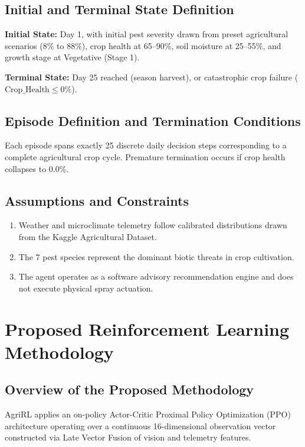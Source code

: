 \documentclass[12pt,a4paper]{report}
\begin{document}
\section{Initial and Terminal State Definition}
\textbf{Initial State:} Day 1, with initial pest severity drawn from preset agricultural scenarios (8\% to 88\%), crop health at 65--90\%, soil moisture at 25--55\%, and growth stage at Vegetative (Stage 1).

\textbf{Terminal State:} Day 25 reached (season harvest), or catastrophic crop failure ($\text{Crop\_Health} \le 0\%$).

\section{Episode Definition and Termination Conditions}
Each episode spans exactly 25 discrete daily decision steps corresponding to a complete agricultural crop cycle. Premature termination occurs if crop health collapses to 0.0\%.

\section{Assumptions and Constraints}
\begin{enumerate}
    \item Weather and microclimate telemetry follow calibrated distributions drawn from the Kaggle Agricultural Dataset.
    \item The 7 pest species represent the dominant biotic threats in crop cultivation.
    \item The agent operates as a software advisory recommendation engine and does not execute physical spray actuation.
\end{enumerate}

\chapter{Proposed Reinforcement Learning Methodology}

\section{Overview of the Proposed Methodology}
AgriRL applies an on-policy Actor-Critic Proximal Policy Optimization (PPO) architecture operating over a continuous 16-dimensional observation vector constructed via Late Vector Fusion of vision and telemetry features.
\end{document}
